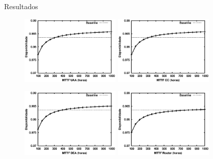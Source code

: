\documentclass{beamer}
\begin{document}
    \begin{frame}{Resultados}

        \begin{figure}
            \centering
            {\includegraphics[width=0.42\textwidth]{img/mttf-uaa.eps}}\qquad
            {\includegraphics[width=0.42\textwidth]{img/mttf-cc.eps}}
        \end{figure}

        \begin{figure}
            \centering
            {\includegraphics[width=0.42\textwidth]{img/mttf-dea.eps}}\qquad    
            {\includegraphics[width=0.42\textwidth]{img/mttf-router.eps}}
        \end{figure}

    \end{frame}    
    
\end{document}
